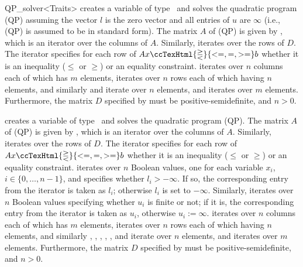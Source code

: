 \begin{ccRefClass}{QP_solver<Traits>}
 {creates a variable of type \ccRefName\ and solves the
quadratic program (QP) assuming the vector $l$ is the zero vector and
all entries of $u$ are $\infty$ (i.e., (QP) is assumed to be in
standard form).  The matrix $A$ of (QP) is given by , which
is an iterator over the columns of $A$.  Similarly, 
iterates over the rows of $D$. The iterator  specifies for
each row of $Ax \ccTexHtml{\gtreqless}{<=,=,>=} b$ whether it is an inequality ($\leq$ or
$\geq$) or an equality constraint.  \ccRequire
{} iterates over $n$ columns each of which has $m$ elements,
 iterates over $n$ rows each of which having $n$ elements,
and similarly  and  iterate over $n$ elements, and
 iterates over $m$ elements.  Furthermore, the matrix $D$
specified by  must be positive-semidefinite, and $n>0$.}

{creates a variable of type \ccRefName\ and solves the quadratic
program (QP).  The matrix $A$ of (QP) is given by , which is
an iterator over the columns of $A$.  Similarly,  iterates
over the rows of $D$. The iterator  specifies for each row
of $Ax \ccTexHtml{\gtreqless}{<=,=,>=} b$ whether it is an inequality ($\leq$ or $\geq$) or
an equality constraint.  iterates over $n$ Boolean values,
one for each variable $x_i$, $i\in\{0,\ldots,n-1\}$, and specifies
whether $l_i>-\infty$.  If so, the corresponding entry from the
iterator  is taken as $l_i$; otherwise $l_i$ is set to
$-\infty$. Similarly,  iterates over $n$ Boolean values
specifying whether $u_i$ is finite or not; if it is, the corresponding
entry from the iterator  is taken as $u_i$, otherwise
$u_i:=\infty$.  \ccRequire {} iterates
over $n$ columns each of which has $m$ elements,  iterates
over $n$ rows each of which having $n$ elements, and similarly
, , , , , and
 iterate over $n$ elements, and  iterates over
$m$ elements.  Furthermore, the matrix $D$ specified by 
must be positive-semidefinite, and $n>0$.}


\end{ccRefClass}
